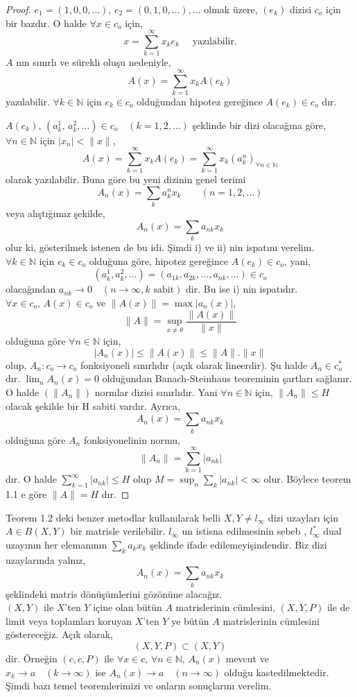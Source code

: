 \begin{proof}
$e_1=(1,0,0,\ldots),\,e_2=(0,1,0,\ldots),\ldots$ olmak üzere, $(e_k)$ dizisi $c_o$ için bir bazdır. O halde $\forall x\in c_o $ için,
$$
x=\sum\limits_{k=1}^\infty x_ke_k \quad\text{  yazılabilir.}
$$
$A$ nın sınırlı ve sürekli oluşu nedeniyle,
$$
A(x)=\sum\limits_{k=1}^\infty x_kA(e_k)
$$
yazılabilir. $\forall k\in \mathbb{N}$ için $e_k\in c_o$ olduğundan hipotez gereğince $A(e_k)\in c_o$ dır.

$A(e_k)$, $(a_k^1,\,a_k^2,\ldots)\in c_o\quad(k=1,2,\ldots)$ şeklinde bir dizi olacağına göre, $\forall n\in \mathbb{N}$ için $|x_n|<\|x\|$,
$$
A(x)=\sum\limits_{k=1}^\infty x_kA(e_k)=\sum\limits_{k=1}^\infty x_k(a_k^n)_{\forall n\in \mathbb{N}}
$$
olarak yazılabilir. Buna göre bu yeni dizinin genel terimi
$$
A_n(x)=\sum_ka_k^nx_k\qquad(n=1,2,\ldots)
$$
veya alıştığımız şekilde,
$$
A_n(x)=\sum_ka_{nk}x_k
$$
olur ki, gösterilmek istenen de bu idi. Şimdi i) ve ii) nin ispatını verelim.\\[5pt]

$\forall k\in \mathbb{N}$ için $e_k\in c_o$ olduğuna göre, hipotez gereğince $A(e_k)\in c_o$, yani,
$$
(a_k^1,a_k^2,\ldots)=(a_{1k},a_{2k},\ldots,a_{nk},\ldots)\in c_o
$$
olacağından $a_{nk}\to 0\quad(n\to\infty, k\text{ sabit})$ dir. Bu ise i) nin ispatıdır.\\[5pt]

$\forall x\in c_o,\,A(x)\in c_o$ ve $\|A(x)\|=\max|a_n(x)|$,
$$
\|A\|=\sup_{x\neq\theta}\frac{\|A(x)\|}{\|x\|}
$$
olduğuna göre $\forall n\in\mathbb{N}$ için, $$|A_n(x)|\leq\|A(x)\|\leq\|A\|.\|x\|$$ olup, $A_n:c_o\to c_o$ fonksiyoneli sınırlıdır (açık olarak lineerdir). Şu halde $A_n\in c_o^*$ dır. $\lim_nA_n(x)=0$ olduğundan Banach-Steinhaus teoreminin şartları sağlanır. O halde $(\|A_n\|)$ normlar dizisi sınırlıdır. Yani $\forall n\in\mathbb{N}$ için, $\|A_n\|\leq H$ olacak şekilde bir H sabiti vardır. Ayrıca,
$$
A_n(x)=\sum_ka_{nk}x_k
$$
olduğuna göre $A_n$ fonksiyonelinin normu,
$$
\|A_n\|=\sum_{k=1}^\infty|a_{nk}|
$$
dır. O halde $\sum_{k=1}^\infty|a_{nk}|\leq H$ olup $M=\sup_n\sum_k|a_{nk}|<\infty$ olur. Böylece teorem 1.1 e göre $\|A\|=H$ dır.
\end{proof}

Teorem 1.2 deki benzer metodlar kullanılarak belli $X,Y\neq l_\infty$ dizi uzayları için $A\in B(X,Y)$ bir matrisle verilebilir. $l_\infty$ un istisna edilmesinin sebeb
, $l_\infty^*$ dual  uzayının her elemanının $\sum_ka_kx_k$ şeklinde ifade edilemeyişindendir. Biz dizi uzaylarında yalnız,
$$
A_n(x)=\sum_ka_{nk}x_k
$$
şeklindeki matris dönüşümlerini gözönüne alacağız.\\[5pt]
$(X,Y)$ ile $X$'ten $Y$ içine olan bütün $A$ matrislerinin cümlesini, $(X,Y,P)$ ile de limit veya toplamları koruyan $X$'ten $Y$ ye bütün $A$ matrislerinin cümlesini göstereceğiz. Açık olarak,
$$
(X,Y,P)\subset(X,Y)
$$
dir. Örneğin $(c,c,P)$ ile $\forall x\in c,\,\forall n\in\mathbb{N},\,A_n(x)$ mevcut ve $x_k\to a\quad(k\to\infty)$ ise $A_n(x)\to a\quad(n\to\infty)$ olduğu kastedilmektedir.\\[5pt]
Şimdi bazı temel teoremlerimizi ve onların sonuçlarını verelim.\

